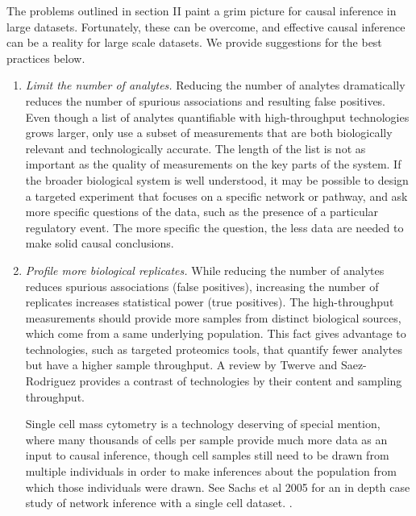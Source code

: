 \documentclass[journal=jacsat,manuscript=article]{achemso}
\def\added#1{{\color{blue} #1}}
\begin{document}
The problems outlined in section II paint a grim picture for causal inference in large datasets. Fortunately, these can be overcome, and effective causal inference can be a reality for large scale datasets.  We provide suggestions for the best practices below.

\begin{enumerate}
\item \textit{Limit the number of analytes.} \added{Reducing the number of analytes dramatically reduces the number of spurious associations and resulting false positives.} Even though a list of analytes quantifiable with high-throughput technologies grows larger, only use a subset of measurements that are both biologically relevant and technologically accurate. The length of the list is not as important as the quality of measurements on the key parts of the system.  If the broader biological system is well understood, it may be possible to design a targeted experiment that focuses on a specific network or pathway, and ask more specific questions of the data, such as the presence of a particular regulatory event.  The more specific the question, the less data are needed to make solid causal conclusions.  

\item \textit{Profile more biological replicates.}  \added{While reducing the number of analytes reduces spurious associations (false positives), increasing the number of replicates increases statistical power (true positives).}  The high-throughput measurements should provide more samples from distinct biological sources, which come from a same underlying population.  This fact gives advantage to technologies, such as targeted proteomics tools, that quantify fewer analytes but have a higher sample throughput.  \added{A review by Twerve and Saez-Rodriguez provides a contrast of technologies by their content and sampling throughput\cite{SaezRodriguez:2012kx}.} 

\added{Single cell mass cytometry is a technology deserving of special mention, where many thousands of cells per sample provide much more data as an input to causal inference, though cell samples still need to be drawn from multiple individuals in order to make inferences about the population from which those individuals were drawn}. See Sachs et al 2005 for an in depth case study of network inference with a single cell dataset. \cite{sachs2005causal}.  


\end{enumerate}
\end{document}
